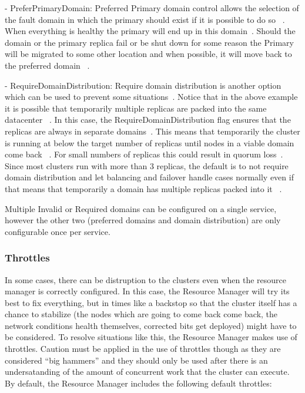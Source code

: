 - PreferPrimaryDomain: Preferred Primary domain control
  allows the selection of the fault domain in which
  the primary should exist if it is possible to do so
~\cite{hid-sp18-501-placement}. 
  When everything is healthy the primary will
  end up in this domain~\cite{hid-sp18-501-placement}. 
  Should the domain or the
  primary replica fail or be shut down for some reason
  the Primary will be migrated to some
  other location and when possible, it will move back
  to the preferred domain
~\cite{hid-sp18-501-placement}.

- RequireDomainDistribution: Require domain distribution
  is another option which can be used to prevent
  some situations~\cite{hid-sp18-501-placement}. Notice that 
  in
  the above example it is possible that temporarily
  multiple replicas
  are packed into the same datacenter
~\cite{hid-sp18-501-placement}. In this case, the
  RequireDomainDistribution flag ensures that the 
  replicas are always
  in separate domains~\cite{hid-sp18-501-placement}. 
  This means that temporarily
  the cluster is running at below the target number
  of replicas until nodes in a viable domain come back
~\cite{hid-sp18-501-placement}. 
  For small numbers of replicas this could
  result in quorum loss~\cite{hid-sp18-501-placement}. 
  Since most clusters run
  with more than 3
  replicas, the default is to not require domain
  distribution and let
  balancing and failover handle cases normally even
  if that means that temporarily a domain has multiple
  replicas packed into it
~\cite{hid-sp18-501-placement}.


Multiple Invalid or Required domains can be configured on a single
service, however the other two (preferred domains and domain
distribution) are only configurable once per service.

\subsubsection{Throttles}
In some cases, there can be distruption to the clusters
even when the resource manager is correctly configured. 
In this case, the Resource Manager will try its best to fix
everything, but in times like a backstop so that the cluster itself
has a chance to stabilize (the nodes which are going to come back come
back, the network conditions health themselves, corrected bits get
deployed) might have to be considered. To resolve situations like this, 
the Resource Manager makes use of throttles. Caution must be applied in 
the use of throttles though
as they are considered ``big hammers'' and they should only be used after 
there is an undersatanding of the amount of
concurrent work that the cluster can execute. 
By default, the Resource Manager includes the
following default throttles:



